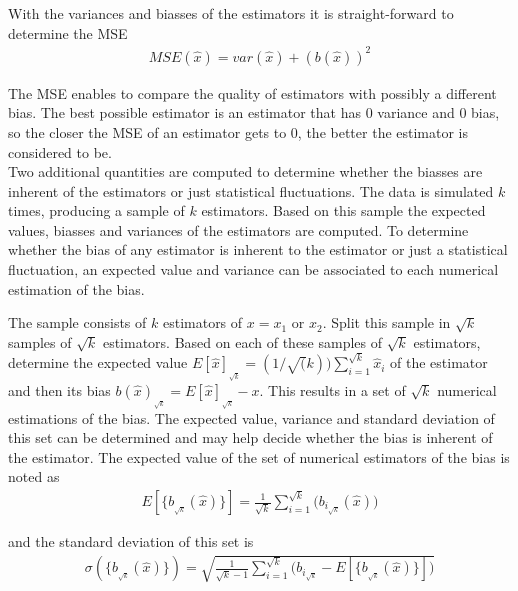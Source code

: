 \documentclass[report,12pt]{report}
\begin{document}
With the variances and biasses of the estimators it is straight-forward to determine the MSE
\begin{align}
	MSE(\hat x) = var(\hat x) + \left(b(\hat x)\right)^2
\end{align}

The MSE enables to compare the quality of estimators with possibly a different bias. The best possible estimator is an estimator that has 0 variance and 0 bias, so the closer the MSE of an estimator gets to 0, the better the estimator is considered to be.\\

Two additional quantities are computed to determine whether the biasses are inherent of the estimators or just statistical fluctuations. The data is simulated $k$ times, producing a sample of $k$ estimators. Based on this sample the expected values, biasses and variances of the estimators are computed. To determine whether the bias of any estimator is inherent to the estimator or just a statistical fluctuation, an expected value and variance can be associated to each numerical estimation of the bias.

The sample consists of $k$ estimators of $x = x_1$ or $x_2$. Split this sample in $\sqrt{k}$ samples of $\sqrt{k}$ estimators. Based on each of these samples of $\sqrt{k}$ estimators, determine the expected value $E[\hat x]_{_{\sqrt{k}}} = (1/\sqrt(k))\sum_{i=1}^{\sqrt{k}} \hat x_i$ of the estimator and then its bias $b(\hat x)_{_{\sqrt{k}}} = E[\hat x]_{_{\sqrt{k}}} - x$. This results in a set of $\sqrt{k}$ numerical estimations of the bias. The expected value, variance and standard deviation of this set can be determined and may help decide whether the bias is inherent of the estimator. The expected value of the set of numerical estimators of the bias is noted as
\begin{align}
E[\{b_{_{\sqrt{k}}}(\hat x)\}] = \frac{1}{\sqrt{k}} \sum_{i=1}^{\sqrt{k}} \big( b_{i_{\sqrt{k}}}(\hat x) \big)
\end{align}

and the standard deviation of this set is
\begin{align}
\sigma(\{b_{_{\sqrt{k}}}(\hat x)\}) = \sqrt{\frac{1}{\sqrt{k}-1}\sum_{i=1}^{\sqrt{k}}\big( b_{i_{\sqrt{k}}} - E[\{b_{_{\sqrt{k}}}(\hat x)\}]\big)}
\end{align}
\end{document}
